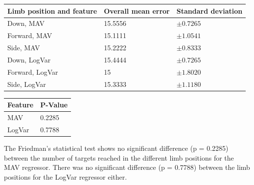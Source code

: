 	\begin{center}
		\begin{tabular}{l l l}
			\toprule
			\textbf{Limb position and feature} & \textbf{Overall mean error} & \textbf{Standard deviation}\\
			\midrule
			Down, MAV & 15.5556 & $\pm 0.7265$ \\
			Forward, MAV & 15.1111 & $\pm 1.0541$ \\
			Side, MAV & 15.2222 & $\pm 0.8333$ \\
			Down, LogVar & 15.4444 & $\pm 0.7265$ \\
			Forward, LogVar & 15 & $\pm 1.8020$ \\
			Side, LogVar & 15.3333 & $\pm 1.1180$ \\
			\bottomrule
		\end{tabular}
	\end{center}

	\begin{center}
		\begin{tabular}{l l}
			\toprule
			\textbf{Feature} & \textbf{P-Value}\\
			\midrule
			MAV & 0.2285 \\
			LogVar & 0.7788 \\
			\bottomrule
		\end{tabular}
	\end{center}
	
The Friedman's statistical test shows no significant difference (p = 0.2285) between the number of targets reached in the different limb positions for the MAV regressor. There was no significant difference (p = 0.7788) between the limb positions for the LogVar regressor either.


